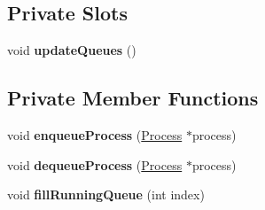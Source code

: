 \subsection*{Private Slots}
\begin{DoxyCompactItemize}
\item 
\mbox{\label{classProductionManager_a80f800ba0bedcf7efe4c721d683af8c6}} 
void {\bfseries update\+Queues} ()
\end{DoxyCompactItemize}
\subsection*{Private Member Functions}
\begin{DoxyCompactItemize}
\item 
\mbox{\label{classProductionManager_a24834c9d1b5e3cbcf092f558b50fc9b4}} 
void {\bfseries enqueue\+Process} (\hyperlink{classProcess}{Process} $\ast$process)
\item 
\mbox{\label{classProductionManager_aa1af994a472e9dafae97bef8aa48d145}} 
void {\bfseries dequeue\+Process} (\hyperlink{classProcess}{Process} $\ast$process)
\item 
\mbox{\label{classProductionManager_a89fd7fe60dbc3d32d5db1c79ef3f3a81}} 
void {\bfseries fill\+Running\+Queue} (int index)
\end{DoxyCompactItemize}
